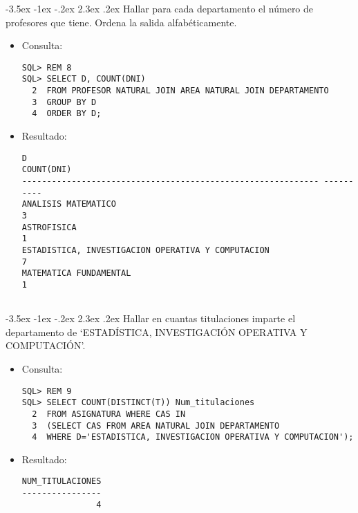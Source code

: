 \documentclass[11pt]{report}
\makeatletter
\renewcommand\chapter{\@startsection{chapter}{0}{\z@}%
    {-3.5ex \@plus -1ex \@minus -.2ex}%
    {2.3ex \@plus.2ex}%
    {\normalfont\Large\bfseries}}
\makeatother
\begin{document}
\chapter{Hallar para cada departamento el número de profesores que tiene. Ordena la salida alfabéticamente.}
\begin{itemize}
  \item Consulta:
  \begin{verbatim}
SQL> REM 8
SQL> SELECT D, COUNT(DNI)
  2  FROM PROFESOR NATURAL JOIN AREA NATURAL JOIN DEPARTAMENTO
  3  GROUP BY D
  4  ORDER BY D;
  \end{verbatim}
  \item{Resultado:}
  \begin{verbatim}
D                                                            COUNT(DNI)         
------------------------------------------------------------ ----------         
ANALISIS MATEMATICO                                                   3         
ASTROFISICA                                                           1         
ESTADISTICA, INVESTIGACION OPERATIVA Y COMPUTACION                    7         
MATEMATICA FUNDAMENTAL                                                1         
                                                                            
  \end{verbatim}
\end{itemize}

\chapter{Hallar en cuantas titulaciones imparte el departamento de ‘ESTADÍSTICA, INVESTIGACIÓN OPERATIVA Y COMPUTACIÓN’.}
\begin{itemize}
  \item Consulta:
  \begin{verbatim}
SQL> REM 9
SQL> SELECT COUNT(DISTINCT(T)) Num_titulaciones
  2  FROM ASIGNATURA WHERE CAS IN
  3  (SELECT CAS FROM AREA NATURAL JOIN DEPARTAMENTO
  4  WHERE D='ESTADISTICA, INVESTIGACION OPERATIVA Y COMPUTACION');
  \end{verbatim}
  \item{Resultado:}
  \begin{verbatim}
NUM_TITULACIONES                                                                
----------------                                                                
               4                                                                       
  \end{verbatim}
\end{itemize}
\end{document}
